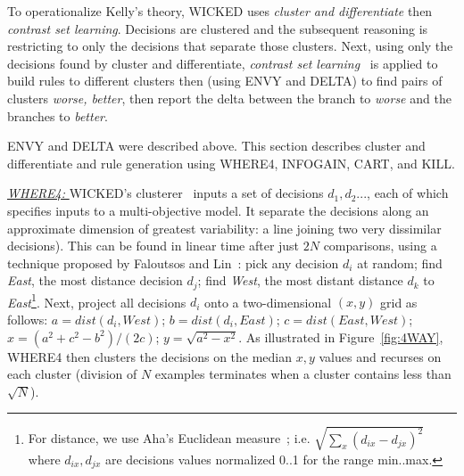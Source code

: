 \documentclass[runningheads]{llncs}
\newcommand{\fig}[1]{Figure~\ref{fig:#1}}
\begin{document}
To  operationalize
Kelly's theory, WICKED  uses {\em cluster and
  differentiate} then {\em contrast set learning}.
Decisions are  clustered and the
subsequent reasoning is restricting to only the
decisions that separate  those clusters. Next,
using only the decisions found by cluster and differentiate,
 {\em contrast set learning}~\cite{webb09} 
is applied to
build rules to different clusters then (using ENVY and DELTA)
to find pairs of clusters {\em worse, better}, then
report the delta between the branch to {\em worse} and
the branches to {\em better}.

ENVY and DELTA were described above.
This section describes cluster and differentiate and rule generation
using
WHERE4, INFOGAIN, CART, and KILL.

\underline{{\em WHERE4: }}
WICKED's clusterer~\cite{me12d}
inputs a set of decisions
$d_1,d_2...$, each of which specifies
inputs to a multi-objective model.
It separate the decisions along an
approximate dimension
of greatest variability: a line joining two very dissimilar
decisions). This can be found in linear
time after just $2N$ comparisons,
using a technique proposed by Faloutsos and Lin~\cite{Faloutsos1995}: 
 pick any decision $d_i$ at random; find {\em East},
the most distance decision $d_j$; find {\em West}, the most distant 
distance $d_k$ to {\em East}\footnote{
 For distance, we use Aha's Euclidean measure~\cite{aha91};
i.e. $\sqrt{\sum_x(d_{ix}-d_{jx})^2}$ where $d_{ix},d_{jx}$ 
are decisions values normalized 0..1 for the range min..max.}.
Next, project all  decisions $d_i$ onto a two-dimensional
$(x,y)$ grid as follows:  
$a=\mathit{dist}(d_i,\mathit{West})$;
$b=\mathit{dist}(d_i,\mathit{East})$;
$c=\mathit{dist}(\mathit{East},\mathit{West})$;
$x=(a^2 + c^2 - b^2)/(2c)$;
$y=\sqrt{a^2 - x^2}$.
As illustrated in \fig{4WAY},
WHERE4 then clusters the decisions on the median $x,y$ values
and recurses on each cluster (division of $N$ examples terminates
when a cluster contains less than $\sqrt{N}$).
\end{document}
